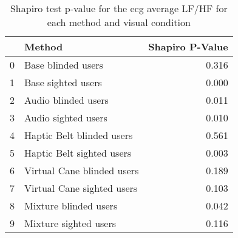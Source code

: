 
\begin{table}[!htb]
\centering
\caption{Shapiro test p-value for the ecg average LF/HF for each method and visual condition}
\label{tab:shapiro_ecg_lfhf}
\begin{tabular}{llr}
\toprule
{} &                      Method &  Shapiro P-Value \\
\midrule
0 &          Base blinded users &            0.316 \\
1 &          Base sighted users &            0.000 \\
2 &         Audio blinded users &            0.011 \\
3 &         Audio sighted users &            0.010 \\
4 &   Haptic Belt blinded users &            0.561 \\
5 &   Haptic Belt sighted users &            0.003 \\
6 &  Virtual Cane blinded users &            0.189 \\
7 &  Virtual Cane sighted users &            0.103 \\
8 &       Mixture blinded users &            0.042 \\
9 &       Mixture sighted users &            0.116 \\
\bottomrule
\end{tabular}
\end{table}

